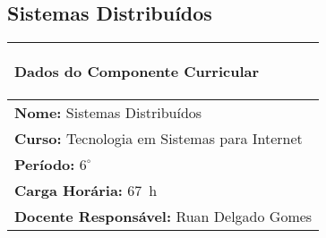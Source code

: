 \subsection{Sistemas Distribuídos}

\begin{table}[h!]
\centering

\begin{small} 
  
\setlength{\tabcolsep}{3pt} 
\begin{tabular}{|p{15cm}|}\hline

\begin{center}\textbf{Dados do Componente Curricular}\end{center}\\ \hline
\textbf{Nome:} Sistemas Distribuídos \\ \hline
\textbf{Curso:} Tecnologia em Sistemas para Internet \\ \hline
\textbf{Período:} $6^{\circ}$ \\ \hline
\textbf{Carga Horária:} 67~h \\ \hline
\textbf{Docente Responsável:} Ruan Delgado Gomes \\ \hline
\end{tabular} 
\end{small}
\label{dadosinstituicao}
\end{table} 

